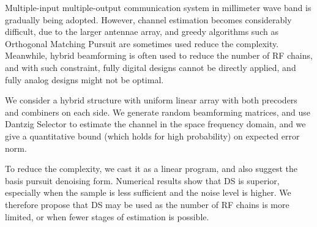 
\starttitle [title={Abstract}]

Multiple-input multiple-output communication system in millimeter wave band is gradually being adopted.
However, channel estimation becomes considerably difficult, due to the larger antennae array, and greedy algorithms such as Orthogonal Matching Pursuit are sometimes used reduce the complexity.
Meanwhile, hybrid beamforming is often used to reduce the number of RF chains, and with such constraint, fully digital designs cannot be directly applied, and fully analog designs might not be optimal.

We consider a hybrid structure with uniform linear array with both precoders and combiners on each side.
We generate random beamforming matrices, and use Dantzig Selector to estimate the channel in the space frequency domain, and we give a quantitative bound (which holds for high probability) on expected error norm.

To reduce the complexity, we cast it as a linear program, and also suggest the basis pursuit denoising form.
Numerical results show that DS is superior, especially when the sample is less sufficient and the noise level is higher.
We therefore propose that DS may be used as the number of RF chains is more limited, or when fewer stages of estimation is possible.



\stoptitle

